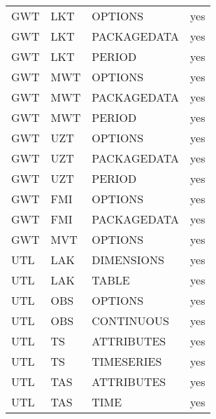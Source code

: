 \begin{longtable}{p{1.5cm} p{1.5cm} p{3cm} c}
\hline
GWT & LKT & OPTIONS & yes \\ 
GWT & LKT & PACKAGEDATA & yes \\ 
GWT & LKT & PERIOD & yes \\ 
\hline
GWT & MWT & OPTIONS & yes \\ 
GWT & MWT & PACKAGEDATA & yes \\ 
GWT & MWT & PERIOD & yes \\ 
\hline
GWT & UZT & OPTIONS & yes \\ 
GWT & UZT & PACKAGEDATA & yes \\ 
GWT & UZT & PERIOD & yes \\ 
\hline
GWT & FMI & OPTIONS & yes \\ 
GWT & FMI & PACKAGEDATA & yes \\ 
\hline
GWT & MVT & OPTIONS & yes \\ 
\hline
UTL & LAK & DIMENSIONS & yes \\ 
UTL & LAK & TABLE & yes \\ 
\hline
UTL & OBS & OPTIONS & yes \\ 
UTL & OBS & CONTINUOUS & yes \\ 
\hline
UTL & TS & ATTRIBUTES & yes \\ 
UTL & TS & TIMESERIES & yes \\ 
\hline
UTL & TAS & ATTRIBUTES & yes \\ 
UTL & TAS & TIME & yes \\ 


\hline
\end{longtable}
\label{table:blocks}
\normalsize
